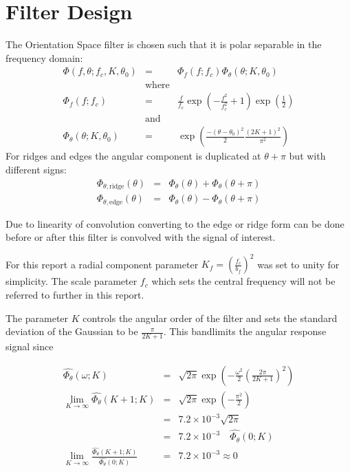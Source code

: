\documentclass{article}
\begin{document}
\section{Filter Design}
The Orientation Space filter is chosen such that it is polar separable in the frequency domain:
\begin{eqnarray}
    \Phi(f,\theta; f_c, K, \theta_0) & = & \Phi_f(f; f_c) \Phi_\theta(\theta; K, \theta_0) \\
    & \mbox{where} & \nonumber \\
    \Phi_f(f; f_c) & = & \frac{f}{f_c} \exp(-\frac{f^2}{f_c^2}+1) \exp(\frac{1}{2}) \\
    & \mbox{and} & \nonumber \\
    \Phi_\theta(\theta; K, \theta_0) & = & \exp \left(\frac{-(\theta-\theta_0)^2}{2} \frac{(2K+1)^2}{\pi^2} \right)
\end{eqnarray}
For ridges and edges the angular component is duplicated at $ \theta + \pi $ but with different signs:
\begin{eqnarray}
    \Phi_{\theta,\mbox{ridge}}(\theta) & = & \Phi_{\theta}(\theta) + \Phi_{\theta}(\theta+\pi) \\
    \Phi_{\theta,\mbox{edge}}(\theta) & = & \Phi_{\theta}(\theta) - \Phi_{\theta}(\theta+\pi)
\end{eqnarray}

Due to linearity of convolution converting to the edge or ridge form can be done before or after this filter is convolved with the signal of interest.

For this report a radial component parameter $ K_f = (\frac{f_c}{b_f})^2 $ was set to unity for simplicity. The scale parameter $ f_c $ which sets the central frequency will not be referred to further in this report.

The parameter $ K $ controls the angular order of the filter and sets the standard deviation of the Gaussian to be $ \frac{\pi}{2K+1} $. This bandlimits the angular response signal since

\begin{eqnarray}
	\widehat{\Phi_{\theta}}(\omega ; K) & = & \sqrt{2\pi}\exp\left(-\frac{\omega^2}{2} \left(\frac{2\pi}{2K+1}\right)^2\right)\\
	\lim_{K\to\infty} \widehat{\Phi_{\theta}}(K+1 ; K) & = & \sqrt{2\pi} \exp\left(-\frac{\pi^2}{2}\right) \\
	& = & 7.2 \times 10^{-3} \sqrt{2\pi} \\
    & = & 7.2 \times 10^{-3} \quad \widehat{\Phi_{\theta}}(0 ; K) \\
    \lim_{K\to\infty} \frac{\widehat{\Phi_{\theta}}(K+1 ; K)}{\widehat{\Phi_{\theta}}(0 ; K)} & = & 7.2 \times 10^{-3} \approx  0
\end{eqnarray}
\end{document}
